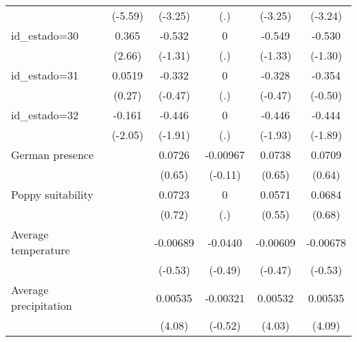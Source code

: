 {\begin{tabular}{l*{5}{c}}
                    &     (-5.59)         &     (-3.25)         &         (.)         &     (-3.25)         &     (-3.24)         \\
[1em]
id\_estado=30        &       0.365\sym{**} &      -0.532         &           0         &      -0.549         &      -0.530         \\
                    &      (2.66)         &     (-1.31)         &         (.)         &     (-1.33)         &     (-1.30)         \\
[1em]
id\_estado=31        &      0.0519         &      -0.332         &           0         &      -0.328         &      -0.354         \\
                    &      (0.27)         &     (-0.47)         &         (.)         &     (-0.47)         &     (-0.50)         \\
[1em]
id\_estado=32        &      -0.161\sym{*}  &      -0.446         &           0         &      -0.446         &      -0.444         \\
                    &     (-2.05)         &     (-1.91)         &         (.)         &     (-1.93)         &     (-1.89)         \\
[1em]
German presence     &                     &      0.0726         &    -0.00967         &      0.0738         &      0.0709         \\
                    &                     &      (0.65)         &     (-0.11)         &      (0.65)         &      (0.64)         \\
[1em]
Poppy suitability   &                     &      0.0723         &           0         &      0.0571         &      0.0684         \\
                    &                     &      (0.72)         &         (.)         &      (0.55)         &      (0.68)         \\
[1em]
Average temperature &                     &    -0.00689         &     -0.0440         &    -0.00609         &    -0.00678         \\
                    &                     &     (-0.53)         &     (-0.49)         &     (-0.47)         &     (-0.53)         \\
[1em]
Average precipitation&                     &     0.00535\sym{***}&    -0.00321         &     0.00532\sym{***}&     0.00535\sym{***}\\
                    &                     &      (4.08)         &     (-0.52)         &      (4.03)         &      (4.09)         \\

\end{tabular}}
